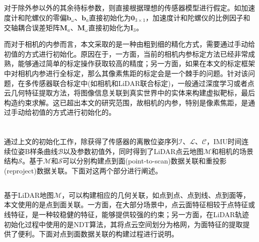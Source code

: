 \subsection{}
对于除外参以外的其余待标参数，则直接根据理想的传感器模型进行假定。如加速度计和陀螺仪的零偏$\boldsymbol{b}_\omega$、$\boldsymbol{b}_a$直接初始化为$\boldsymbol{0}_{3\times 1}$，加速度计和陀螺仪的比例因子和交轴耦合误差矩阵$\boldsymbol{M}_{a}$、$\boldsymbol{M}_{\omega}$直接初始化为$\boldsymbol{I}_3$。

而对于相机的内参而言，本文采取的是一种由粗到细的精化方式，需要通过手动给初值的方式进行初始化。原因在于，一方面，当前的相机内参标定方法已经非常成熟，能够通过简单的标定操作获取较高的精度；另一方面，如果在本文的标定框架中对相机内参进行全标定，那么其像素焦距的标定会是一个棘手的问题。针对该问题，在多传感器联合标定中(如相机和LiDAR联合标定)，一般通过深度学习或者点云几何特征提取方法\cite{yuan2021pixel}，将图像信息关联到真实世界中的实体来构建虚拟靶标，最后构造约束求解。这已超出本文的研究范围，故相机的内参，特别是像素焦距，是通过手动给初值的方式进行初始化的。

\section{}
通过上文的初始化工作，除获得了传感器的离散位姿序列$\mathcal{I}$、$\mathcal{L}$、$\mathcal{C}$，IMU时间连续位姿B样条曲线$\mathcal{B}$以及参数初值外，同时得到了LiDAR点云地图$\mathcal{M}$和相机的场景结构$\mathcal{S}$。基于$\mathcal{M}$和$\mathcal{S}$可以分别构建点到面(point-to-scan)数据关联和重投影(reproject)数据关联。下面对这两个部分进行阐述。

\subsection{}
\label{subsubsec:point_to_plane}
基于LiDAR地图$\mathcal{M}$，可以构建相应的几何关联，如点到点、点到线、点到面等，本文使用的是点到面关联。一方面，在大部分场景中，点云面特征相较于点特征或线特征，是一种较稳健的特征，能够提供较强的约束；另一方面，在LiDAR轨迹初始化过程中使用的是NDT算法，其将点云空间划分为格网，为面特征的提取提供了便利。下面对点到面数据关联的构建过程进行说明。

